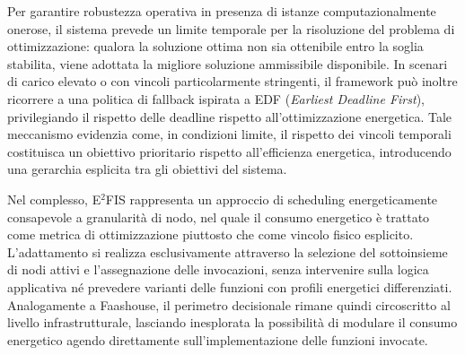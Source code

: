 Per garantire robustezza operativa in presenza di istanze
computazionalmente onerose, il sistema prevede un limite temporale
per la risoluzione del problema di ottimizzazione: qualora la
soluzione ottima non sia ottenibile entro la soglia stabilita, viene
adottata la migliore soluzione ammissibile disponibile. In scenari di
carico elevato o con vincoli particolarmente stringenti, il framework
può inoltre ricorrere a una politica di fallback ispirata a EDF
(\emph{Earliest Deadline First}), privilegiando il rispetto delle
deadline rispetto all'ottimizzazione energetica.
Tale meccanismo evidenzia come, in condizioni limite, il rispetto dei
vincoli temporali costituisca un obiettivo prioritario rispetto
all'efficienza energetica, introducendo una gerarchia esplicita tra
gli obiettivi del sistema.

Nel complesso, E$^{2}$FIS rappresenta un approccio di scheduling
energeticamente consapevole a granularità di nodo, nel quale il
consumo energetico è trattato come metrica di ottimizzazione piuttosto
che come vincolo fisico esplicito. L'adattamento si realizza
esclusivamente attraverso la selezione del sottoinsieme di nodi attivi
e l'assegnazione delle invocazioni, senza intervenire sulla logica
applicativa né prevedere varianti delle funzioni con profili energetici
differenziati. Analogamente a Faashouse, il perimetro decisionale
rimane quindi circoscritto al livello infrastrutturale, lasciando
inesplorata la possibilità di modulare il consumo energetico agendo
direttamente sull'implementazione delle funzioni invocate.
